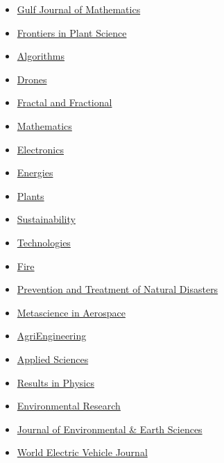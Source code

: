 \documentclass[final, a4paper, oneside, 12pt]{article}
\numberwithin{equation}{section}
\begin{document}
\begin{itemize}
    \item \href{https://gjom.org/}{Gulf Journal of Mathematics}

    \item \href{https://www.frontiersin.org/journals/plant-science/}{
Frontiers in Plant Science}

    \item \href{https://www.mdpi.com/journal/algorithms/}{Algorithms}

    \item \href{https://www.mdpi.com/journal/drones/}{Drones}

    \item \href{https://www.mdpi.com/journal/fractalfract/}{Fractal and Fractional}

    \item \href{https://www.mdpi.com/journal/mathematics/}{Mathematics}

    \item \href{https://www.mdpi.com/journal/electronics/}{Electronics}

    \item \href{https://www.mdpi.com/journal/energies/}{Energies}

    \item \href{https://www.mdpi.com/journal/plants/}{Plants}

    \item \href{https://www.mdpi.com/journal/sustainability/}{Sustainability}

    \item \href{https://www.mdpi.com/journal/technologies/}{Technologies}

    \item \href{https://www.mdpi.com/journal/fire/}{Fire}

    \item \href{https://ojs.ukscip.com/index.php/ptnd/}{Prevention and Treatment of Natural Disasters}

    \item \href{https://www.aimspress.com/journal/mina/}{Metascience in Aerospace}

    \item \href{https://www.mdpi.com/journal/agriengineering/}{AgriEngineering}

    \item \href{https://www.mdpi.com/journal/applsci/}{Applied Sciences}

    \item \href{https://www.sciencedirect.com/journal/results-in-physics/}{Results in Physics}

    \item \href{https://www.sciencedirect.com/journal/environmental-research/ }{Environmental Research}
    
    \item \href{https://journals.bilpubgroup.com/index.php/jees/}{Journal of Environmental \& Earth Sciences}

    \item \href{https://www.mdpi.com/journal/wevj/}{World Electric Vehicle Journal}
    
\end{itemize}
\end{document}
